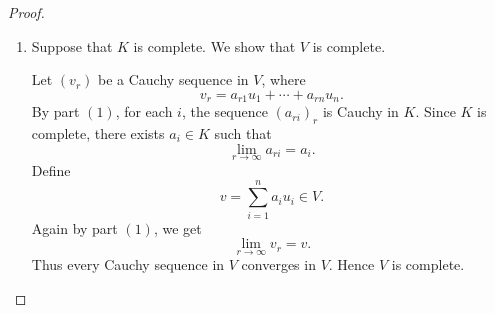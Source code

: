 \begin{proof}
\begin{enumerate}
            Suppose first that $(v_r)$ is Cauchy. Let $i$ be fixed. Since
            \[
                \varphi(a_{ri}-a_{si})
                \leq
                \max_{1\leq j\leq n}\varphi(a_{rj}-a_{sj})
                =
                \|v_r-v_s\|_0,
            \]
            it follows that $(a_{ri})_r$ is a Cauchy sequence in $K$.
        
            Conversely, suppose that for every $i$, the sequence $(a_{ri})_r$ is Cauchy in
            $K$. Let $\varepsilon>0$ be given. For each $i$, there exists $N_i$ such that for
            all $r,s\geq N_i$,
            \[
                \varphi(a_{ri}-a_{si})<\varepsilon.
            \]
            Let
            \[
                N=\max\{N_1,\dots,N_n\}.
            \]
            Then for all $r,s\geq N$ and all $i$, we have
            \[
                \varphi(a_{ri}-a_{si})<\varepsilon.
            \]
            Therefore
            \[
                \|v_r-v_s\|_0
                =
                \max_{1\leq i\leq n}\varphi(a_{ri}-a_{si})
                <
                \varepsilon.
            \]
            Hence $(v_r)$ is Cauchy in $V$.
        
            Next we prove the assertion about convergence. Let
            \[
                v=\sum_{i=1}^n a_i u_i.
            \]
            Then
            \[
                v_r-v
                =
                (a_{r1}-a_1)u_1+\cdots+(a_{rn}-a_n)u_n.
            \]
            Hence
            \[
                \|v_r-v\|_0
                =
                \max_{1\leq i\leq n}\varphi(a_{ri}-a_i).
            \]
            Therefore
            \[
                \lim_{r\to\infty}v_r=v
            \]
            if and only if
            \[
                \lim_{r\to\infty}\max_{1\leq i\leq n}\varphi(a_{ri}-a_i)=0.
            \]
            Since there are only finitely many indices $i$, this is equivalent to
            \[
                \lim_{r\to\infty}\varphi(a_{ri}-a_i)=0
            \]
            for every $i$, which is precisely
            \[
                \lim_{r\to\infty}a_{ri}=a_i
            \]
            for every $i$.
        
            \item Suppose that $K$ is complete. We show that $V$ is complete.
        
            Let $(v_r)$ be a Cauchy sequence in $V$, where
            \[
                v_r=a_{r1}u_1+\cdots+a_{rn}u_n.
            \]
            By part $(1)$, for each $i$, the sequence $(a_{ri})_r$ is Cauchy in $K$.
            Since $K$ is complete, there exists $a_i\in K$ such that
            \[
                \lim_{r\to\infty}a_{ri}=a_i.
            \]
            Define
            \[
                v=\sum_{i=1}^n a_i u_i\in V.
            \]
            Again by part $(1)$, we get
            \[
                \lim_{r\to\infty}v_r=v.
            \]
            Thus every Cauchy sequence in $V$ converges in $V$. Hence $V$ is complete.
        \end{enumerate}
        \end{proof}